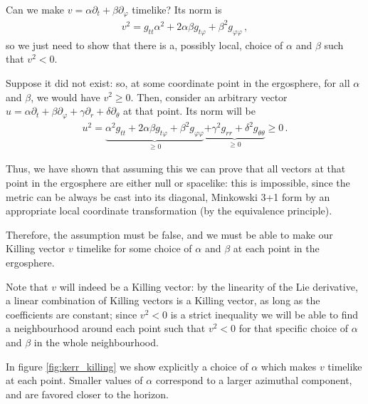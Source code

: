 \documentclass[main.tex]{subfiles}
\begin{document}
Can we make \(v = \alpha \partial_t + \beta \partial_\varphi \) timelike?
Its norm is 
%
\begin{align}
v^2 = g_{tt} \alpha^2 + 2 \alpha \beta g_{t \varphi } + \beta^2 g_{\varphi \varphi }
\,,
\end{align}
%
so we just need to show that there is a, possibly local, choice of \(\alpha \) and \(\beta \) such that \(v^2 < 0\).

Suppose it did not exist: so, at some coordinate point in the ergosphere, for all \(\alpha \) and \(\beta \), we would have \(v^2 \geq 0\). 
Then, consider an arbitrary vector \(u = \alpha \partial_t + \beta \partial_\varphi + \gamma \partial_r + \delta \partial_\theta \) at that point. 
Its norm will be  
%
\begin{align}
u^2 = \underbrace{\alpha^2 g_{tt} + 2 \alpha \beta g_{t \varphi } + \beta^2 g_{\varphi \varphi }}_{\geq 0} \underbrace{+ \gamma^2 g_{rr} + \delta^2 g_{\theta \theta }}_{\geq 0} \geq 0
\,.
\end{align}

Thus, we have shown that assuming this we can prove that all vectors at that point in the ergosphere are either null or spacelike: 
this is impossible, since the metric can be always be cast into its diagonal, Minkowski 3+1 form by an appropriate local coordinate transformation (by the equivalence principle).

Therefore, the assumption must be false, and we must be able to make our Killing vector \(v\) timelike for some choice of \(\alpha \) and \(\beta \) at each point in the ergosphere.

Note that \(v\) will indeed be a Killing vector: by the linearity of the Lie derivative, a linear combination of Killing vectors is a Killing vector, as long as the coefficients are constant; since \(v^2 < 0\) is a strict inequality we will be able to find a neighbourhood around each point such that \(v^2 < 0\) for that specific choice of \(\alpha \) and \(\beta\) in the whole neighbourhood. 

In figure \ref{fig:kerr_killing} we show explicitly a choice of \(\alpha \) which makes \(v\) timelike at each point. Smaller values of \(\alpha \) correspond to a larger azimuthal component, and are favored closer to the horizon. 
\end{document}
